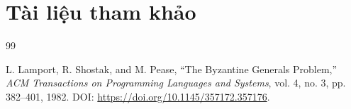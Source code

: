 \section{Tài liệu tham khảo}
\label{sec:references}

\begingroup
\def\chapter#1#2{}

\begin{thebibliography}{99}

L. Lamport, R. Shostak, and M. Pease,
\newblock ``The Byzantine Generals Problem,''
\newblock \emph{ACM Transactions on Programming Languages and Systems}, vol. 4, no. 3, pp. 382--401, 1982.
\newblock DOI: \url{https://doi.org/10.1145/357172.357176}.










\end{thebibliography}
\endgroup